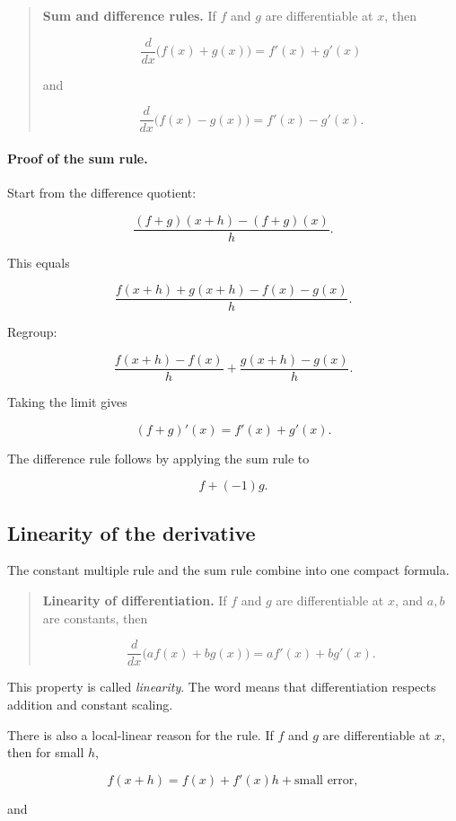 \begin{quote}
\textbf{Sum and difference rules.}
If \(f\) and \(g\) are differentiable at \(x\), then

\[
\boxed{
\frac{d}{dx}\bigl(f(x)+g(x)\bigr)=f'(x)+g'(x)
}
\]

and

\[
\boxed{
\frac{d}{dx}\bigl(f(x)-g(x)\bigr)=f'(x)-g'(x).
}
\]
\end{quote}

\paragraph{Proof of the sum rule.}
Start from the difference quotient:

\[
\frac{(f+g)(x+h)-(f+g)(x)}{h}.
\]

This equals

\[
\frac{f(x+h)+g(x+h)-f(x)-g(x)}{h}.
\]

Regroup:

\[
\frac{f(x+h)-f(x)}{h}
+
\frac{g(x+h)-g(x)}{h}.
\]

Taking the limit gives

\[
(f+g)'(x)=f'(x)+g'(x).
\]

The difference rule follows by applying the sum rule to

\[
f+(-1)g.
\]

\subsection{Linearity of the derivative}
\label{subsec:linearity-of-derivative}

The constant multiple rule and the sum rule combine into one compact formula.

\begin{quote}
\textbf{Linearity of differentiation.}
If \(f\) and \(g\) are differentiable at \(x\), and \(a,b\) are constants, then

\[
\boxed{
\frac{d}{dx}\bigl(a f(x)+b g(x)\bigr)
=
a f'(x)+b g'(x).
}
\]
\end{quote}

This property is called \emph{linearity}.  The word means that differentiation respects addition and constant scaling.

There is also a local-linear reason for the rule.  If \(f\) and \(g\) are differentiable at \(x\), then for small \(h\),

\[
f(x+h)=f(x)+f'(x)h+\text{small error},
\]

and

